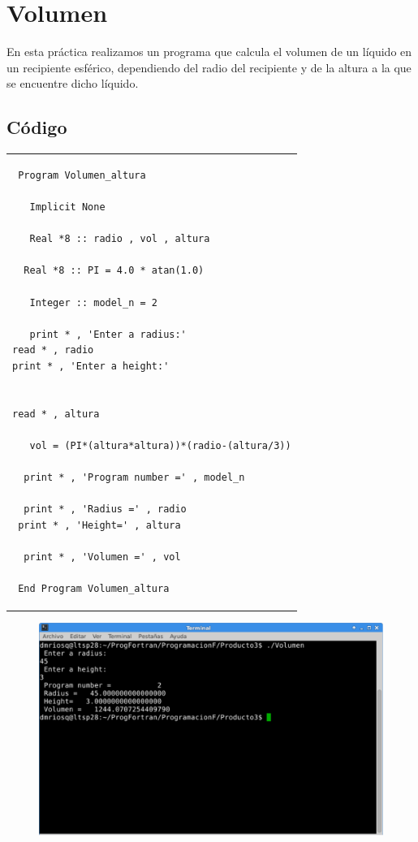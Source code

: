\documentclass[10pt]{article}
\begin{document}
\section{Volumen}
En esta práctica realizamos un programa que calcula el volumen de un líquido en un recipiente esférico, dependiendo del radio del recipiente y de la altura a la que se encuentre dicho líquido.


\subsection{Código}
\begin{tabular}{l}
\begin{verbatim}  
 Program Volumen_altura 

   Implicit None 

   Real *8 :: radio , vol , altura 

  Real *8 :: PI = 4.0 * atan(1.0) 

   Integer :: model_n = 2 

   print * , 'Enter a radius:'
read * , radio 
print * , 'Enter a height:'

    
read * , altura

   vol = (PI*(altura*altura))*(radio-(altura/3))

  print * , 'Program number =' , model_n 

  print * , 'Radius =' , radio 
 print * , 'Height=' , altura
   
  print * , 'Volumen =' , vol 

 End Program Volumen_altura
\end{verbatim}
\end{tabular}


\begin{figure}
  \centering
    \includegraphics[scale=0.4]{V}
\end{figure}
\end{document}
